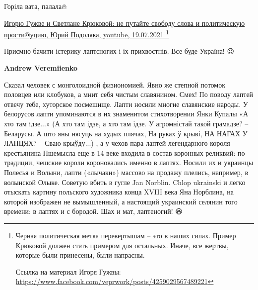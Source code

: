 \begin{itemize}
Горіла вата, палала🔥

 
\href{https://youtu.be/gLKuHECGVM8}{%
Игорю Гужве и Светлане Крюковой: не путайте свободу слова и политическую прости@уцию, Юрий Подоляка, youtube, 19.07.2021%
}
\footnote{
Черная политическая метка перевертышам – это в наших силах. Пример Крюковой
должен стать примером для остальных. Иначе, все жертвы, которые были принесены,
были напрасны.

Ссылка на материал Игоря Гужвы: \url{https://www.facebook.com/veprwork/posts/4259029567489221}
}

 
Приємно бачити істерику лаптєногих і їх прихвостнів. Все буде Україна! 😉


\begin{itemize}
 
\textbf{Andrew Veremiienko}

Сказал человек с монголоидной физиономией. Явно же степной потомок половцев или
клобуков, а мнит себя чистым славянином. Смех! По поводу лаптей отвечу тебе,
хуторское посмешище. Лапти носили многие славянские народы. У белорусов лапти
упоминаются в их знаменитом стихотворении Янки Купалы «А хто там iдзе...» (А
хто там ідзе, а хто там ідзе. У агромністай такой грамадзе? – Беларусы. А што
яны нясуць на худых плячах, На руках ў крыві, НА НАГАХ У ЛАПЦЯХ? – Сваю
крыўду...) , а у чехов пара лаптей легендарного короля-крестьянина Пшемысла еще в
14 веке входила в состав коронных реликвий: по традиции, чешские короли
короновались именно в лаптях. Носили их и украинцы Полесья и Волыни, лапти
(«лычаки») массово на продажу плелись, например, в волынской Олыке. Советую
вбить в гугле Jan Norblin. Chlop ukrainski и легко отыскать картину польского
художника конца XVIII века Яна Норблина, на которой изображен не вымышленный, а
настоящий украинский селянин того времени: в лаптях и с бородой. Шах и мат,
лаптеногий! 😆



\end{itemize}
\end{itemize}
